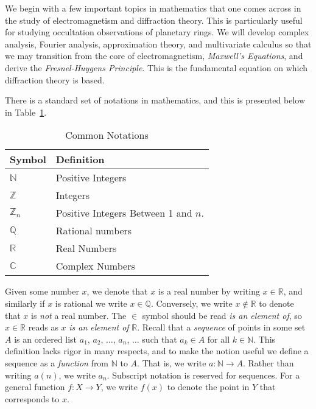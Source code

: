 We begin with a few important topics in mathematics that one comes
across in the study of electromagnetism and diffraction theory.
This is particularly useful for studying occultation observations
of planetary rings. We will develop complex analysis, Fourier analysis,
approximation theory, and multivariate calculus so that we may
transition from the core of electromagnetism, \textit{Maxwell's Equations},
and derive the \textit{Fresnel-Huygens Principle}. This is the fundamental
equation on which diffraction theory is based.
\par\hfill\par
There is a standard set of notations in mathematics, and this is
presented below in Table~\ref{tab:Common_Notations}.
\begin{table}[H]
    \centering
    \captionsetup{type=table}
    \begin{tabular}{|l|l|}
        \hline
        Symbol&Definition\\
        \hline
        $\mathbb{N}$&Positive Integers\\
        \hline
        $\mathbb{Z}$&Integers\\
        \hline
        $\mathbb{Z}_{n}$&Positive Integers Between 1 and $n$.\\
        \hline
        $\mathbb{Q}$&Rational numbers\\
        \hline
        $\mathbb{R}$&Real Numbers\\
        \hline
        $\mathbb{C}$&Complex Numbers\\
        \hline
    \end{tabular}
    \caption{Common Notations}
    \label{tab:Common_Notations}
\end{table}
Given some number $x$, we denote that $x$ is a real number by writing
$x\in\mathbb{R}$, and similarly if $x$ is rational we write
$x\in\mathbb{Q}$. Conversely, we write $x\notin\mathbb{R}$ to denote that
$x$ is \textit{not} a real number. The $\in$ symbol should be read
\textit{is an element of}, so $x\in\mathbb{R}$ reads as $x$
\textit{is an element of} $\mathbb{R}$. Recall that a
\textit{sequence} of points in some set $A$ is an ordered list
$a_{1}$, $a_{2}$, $\dots$, $a_{n}$, $\dots$ such that $a_{k}\in{A}$
for all $k\in\mathbb{N}$. This definition lacks rigor in many
respects, and to make the notion useful we define a sequence as
a \textit{function} from $\mathbb{N}$ to $A$. That is, we write
$a:\mathbb{N}\rightarrow{A}$. Rather than writing $a(n)$, we write
$a_{n}$. Subscript notation is reserved for sequences. For a
general function $f:X\rightarrow{Y}$, we
write $f(x)$ to denote the point in $Y$ that corresponds to $x$.
